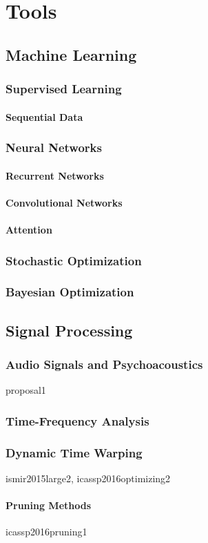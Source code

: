 \chapter{Tools} \label{ch:tools}

\section{Machine Learning}

\subsection{Supervised Learning}

\subsubsection{Sequential Data}

\subsection{Neural Networks}

\subsubsection{Recurrent Networks}

\subsubsection{Convolutional Networks}

\subsubsection{Attention}

\subsection{Stochastic Optimization}

\subsection{Bayesian Optimization}

\section{Signal Processing}

\subsection{Audio Signals and Psychoacoustics}

proposal1

\subsection{Time-Frequency Analysis}

\subsection{Dynamic Time Warping}

ismir2015large2, icassp2016optimizing2

\subsubsection{Pruning Methods}

icassp2016pruning1
